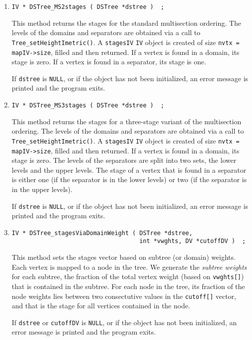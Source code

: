 \begin{enumerate}
\item
\begin{verbatim}
IV * DSTree_MS2stages ( DSTree *dstree )  ;
\end{verbatim}
This method returns the stages for the standard multisection
ordering.
The levels of the domains and separators are obtained via a call to
{\tt Tree\_setHeightImetric()}.
A {\tt stagesIV} {\tt IV} object is created of size 
{\tt nvtx = mapIV->size}, filled 
and then returned.
If a vertex is found in a domain, its stage is zero.
If a vertex is found in a separator, its stage is one.
\par {}
If {\tt dstree} is {\tt NULL},
or if the object has not been initialized,
an error message is printed and the program exits.
\item
\begin{verbatim}
IV * DSTree_MS3stages ( DSTree *dstree )  ;
\end{verbatim}
This method returns the stages for a three-stage variant 
of the multisection ordering.
The levels of the domains and separators are obtained via a call to
{\tt Tree\_setHeightImetric()}.
A {\tt stagesIV} {\tt IV} object is created of size 
{\tt nvtx = mapIV->size}, filled 
and then returned.
If a vertex is found in a domain, its stage is zero.
The levels of the separators are split into two sets, the lower
levels and the upper levels.
The stage of a vertex that is found in a separator is either 
one (if the separator is in the lower levels)
or two (if the separator is in the upper levels).
\par {}
If {\tt dstree} is {\tt NULL},
or if the object has not been initialized,
an error message is printed and the program exits.
\item
\begin{verbatim}
IV * DSTree_stagesViaDomainWeight ( DSTree *dstree, 
                                    int *vwghts, DV *cutoffDV )  ;
\end{verbatim}
This method sets the stages vector based on subtree (or domain) weights.
Each vertex is mapped to a node in the tree.
We generate the {\it subtree weights} for each subtree, the
fraction of the total vertex weight (based on {\tt vwghts[]})
that is contained in the subtree.
For each node in the tree, its fraction of the node weights lies
between two consectutive values in the {\tt cutoff[]} vector,
and that is the stage for all vertices contained in the node.
\par {}
If {\tt dstree} or {\tt cutoffDV} is {\tt NULL},
or if the object has not been initialized,
an error message is printed and the program exits.
\end{enumerate}
\par
\par
